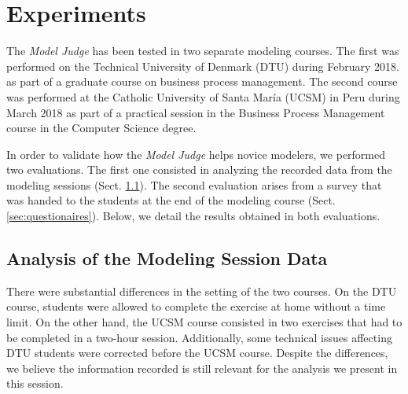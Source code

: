 \section{Experiments}
\label{sec:modeljudge_results}


The \textit{Model Judge} has been tested in two separate modeling courses. The first was performed on the Technical University of Denmark (DTU) during February 2018. as part of a graduate course on business process management. 
The second course was performed at the Catholic University of Santa Mar\'ia (UCSM) in Peru during March 2018 as part of a practical session in the Business Process Management course in the Computer Science degree.

In order to validate how the \textit{Model Judge} helps novice modelers, we performed two evaluations.  The first one consisted in analyzing the recorded data from the modeling sessions (Sect. \ref{sec:data_analysis}). The second evaluation arises from a survey that was handed to the students at the end of the modeling course (Sect. \ref{sec:questionaires}). Below, we detail the results obtained in both evaluations.

\subsection{Analysis of the Modeling Session Data}
\label{sec:data_analysis}
There were substantial differences in the setting of the two courses. On the DTU course, students were allowed to complete the exercise at home without a time limit. On the other hand, the UCSM course consisted in two exercises that had to be completed in a two-hour session.
Additionally, some technical issues affecting DTU students were corrected before the UCSM course. Despite the differences, we believe the information recorded is still relevant for the analysis we present in this session. 

